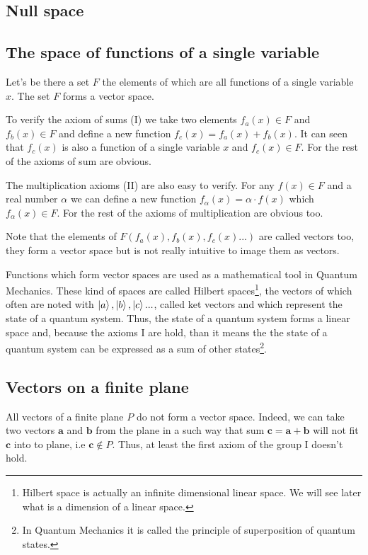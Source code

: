 \documentclass{book}
\begin{document}
\subsection{Null space}

\subsection{The space of functions of a single variable}

Let's be there a set $F$ the elements of which are all functions of a single variable $x$. The set $F$ forms a vector space.

To verify the axiom of sums (I) we take two elements $f_a(x) \in F$ and $f_b(x) \in F$ and define a new function $f_c(x) = f_a(x) + f_b(x)$. It can seen that $f_c(x)$ is also a function of a single variable $x$ and $f_c(x) \in F$. For the rest of the axioms of sum are obvious.

The multiplication axioms (II) are also easy to verify. For any $f(x) \in F$ and a real number $\alpha$ we can define a new function $f_\alpha (x) = \alpha \cdot f(x)$ which $f_\alpha (x) \in F$. For the rest of the axioms of multiplication are obvious too.

Note that the elements of $F(f_a(x), f_b(x), f_c(x)...)$ are called vectors too, they form a vector space but is not really intuitive to image them as vectors.

Functions which form vector spaces are used as a mathematical tool in Quantum Mechanics. These kind of spaces are called Hilbert spaces\footnote{Hilbert space is actually an infinite dimensional linear space\cite{hobson}. We will see later what is a dimension of a linear space.}, the vectors of which often are noted with $\ket{a}, \ket{b}, \ket{c}...$, called ket vectors\cite{dirac} and which represent the state of a quantum system. Thus, the state of a quantum system forms a linear space and, because the axioms I are hold, than it means the the state of a quantum system can be expressed as a sum of other states\footnote{In Quantum Mechanics it is called the principle of superposition of quantum states.\cite{dirac}}.

\subsection{Vectors on a finite plane}

All vectors of a finite plane $P$ do not form a vector space. Indeed, we can take two vectors $\textbf{a}$ and $\textbf{b}$ from the plane in a such way that sum $\textbf{c} = \textbf{a} + \textbf{b}$ will not fit $\textbf{c}$ into to plane, i.e $\textbf{c} \notin P$. Thus, at least the first axiom of the group I doesn't hold.
\end{document}

